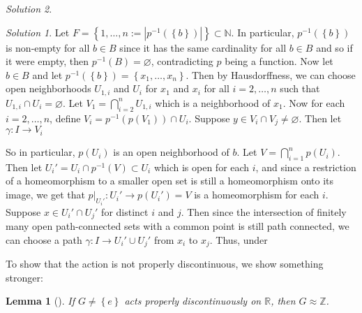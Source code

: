 \documentclass[reqno]{amsart}
\newtheorem{lemma}[theorem]{Lemma}
\theoremstyle{definition}
\theoremstyle{remark}
\newtheorem*{solution}{Solution}
\begin{document}
\begin{solution}
        \begin{solution}
            Let $F = \left\{ 1, \ldots, n:= \left| p^{-1}\left( 
            \left\{ b \right\} \right)  \right|  \right\}\subset 
            \mathbb{N} $. In particular,
            $ p^{-1}\left( \left\{ b \right\}  \right) 
            $ is non-empty for all $b \in B$ since
            it has the same cardinality for all $b \in B$ and
            so if it were empty, then
            $p^{-1}(B) = \varnothing$, contradicting $p$ being
            a function. Now let $b \in B$ and let
            $ p^{-1}(\left\{ b \right\} ) = 
            \left\{ x_1, \ldots, x_n \right\}$. Then
            by Hausdorffness, we can choose
            open neighborhoods  $U_{1,i}$ and
            $U_i$ for $x_1$ and $x_i$ for all $i =2, \ldots, n$ 
            such that $U_{1,i} \cap U_i = \varnothing$. Let
            $V_1 = \bigcap_{i =2}^{n} U_{1,i}$ which is a 
            neighborhood of $x_1$. Now
            for each $i = 2,\ldots,n$, define
            $V_i = p^{-1}\left( p(V_1) \right) 
            \cap U_i$.
            Suppose $y \in V_i \cap V_j \neq \varnothing$. Then
            let $\gamma \colon I \to V_i$



            So in particular, $p\left( U_i \right) $ is an 
            open neighborhood of $b$. Let
            $V = \bigcap_{i=1}^{n} p\left( U_i \right) $.
            Then let $U_i' = U_i \cap p^{-1}(V)
            \subset U_i$ which is
            open for each $i$, and since
            a restriction of a homeomorphism to a smaller
            open set is still a homeomorphism onto its
            image, we get that
            $p |_{U_i'} \colon U_{i}' \to 
            p\left( U_i' \right) = V$ is a homeomorphism
            for each $i$.
            Suppose
            $x \in U_i' \cap U_j'$ for distinct $i$ and $j$.
            Then since the intersection of finitely many 
            open path-connected sets with a common point 
            is still path connected, we can choose
            a path $\gamma \colon I \to U_i' \cup U_j'$
            from $x_i$ to $x_j$. Thus, under

        \end{solution}


        \newpage

        To show that the action is not properly discontinuous,
        we show something stronger:
        \begin{lemma}[]
            If $G \neq \left\{ e \right\} $ acts
            properly discontinuously on $\mathbb{R}$, then
            $G \approx \mathbb{Z}$.
        \end{lemma}


\end{solution}
\end{document}
